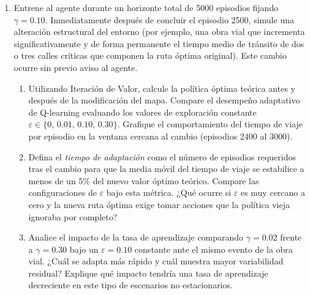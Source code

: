 \documentclass[12pt]{article}
\begin{document}
\begin{enumerate}
\item Entrene al agente durante un horizonte total de 5000 episodios fijando $\gamma=0.10$. Inmediatamente después de concluir el episodio 2500, simule una alteración estructural del entorno (por ejemplo, una obra vial que incrementa significativamente y de forma permanente el tiempo medio de tránsito de dos o tres calles críticas que componen la ruta óptima original). Este cambio ocurre sin previo aviso al agente.
\begin{enumerate}
  \item Utilizando Iteración de Valor, calcule la política óptima teórica antes y después de la modificación del mapa. Compare el desempeño adaptativo de Q-learning evaluando los valores de exploración constante $\varepsilon \in \{0,\,0.01,\,0.10,\,0.30\}$. Grafique el comportamiento del tiempo de viaje por episodio en la ventana cercana al cambio (episodios 2400 al 3000).
  \item Defina el \textit{tiempo de adaptación} como el número de episodios requeridos tras el cambio para que la media móvil del tiempo de viaje se estabilice a menos de un 5\% del nuevo valor óptimo teórico. Compare las configuraciones de $\varepsilon$ bajo esta métrica. ¿Qué ocurre si $\varepsilon$ es muy cercano a cero y la nueva ruta óptima exige tomar acciones que la política vieja ignoraba por completo?
  \item Analice el impacto de la tasa de aprendizaje comparando $\gamma=0.02$ frente a $\gamma=0.30$ bajo un $\varepsilon=0.10$ constante ante el mismo evento de la obra vial. ¿Cuál se adapta más rápido y cuál muestra mayor variabilidad residual? Explique qué impacto tendr\'ia una tasa de aprendizaje decreciente en este tipo de escenarios no estacionarios.
\end{enumerate}

\end{enumerate}
\end{document}
